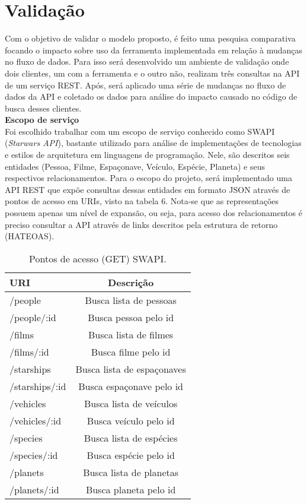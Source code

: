 \section{Validação}

Com o objetivo de validar o modelo proposto, é feito uma pesquisa comparativa focando o impacto sobre uso da ferramenta implementada em relação à mudanças no fluxo de dados. Para isso será desenvolvido um ambiente de validação onde dois clientes, um com a ferramenta e o outro não, realizam três consultas na API de um serviço REST. Após, será aplicado uma série de mudanças no fluxo de dados da API e coletado os dados para análise do impacto causado no código de busca desses clientes. \\

\textbf{Escopo de serviço} \\

Foi escolhido trabalhar com um escopo de serviço conhecido como SWAPI (\textit{Starwars API}), bastante utilizado para análise de implementações de tecnologias e estilos de arquitetura em linguagens de programação. Nele, são descritos seis entidades (Pessoa, Filme, Espaçonave, Veículo, Espécie, Planeta) e seus respectivos relacionamentos. Para o escopo do projeto, será implementado uma API REST que expõe consultas dessas entidades em formato JSON através de pontos de acesso em URIs, visto na tabela 6. Nota-se que as representações possuem apenas um nível de expansão, ou seja, para acesso dos relacionamentos é preciso consultar a API através de links descritos pela estrutura de retorno (HATEOAS).

\begin{table}[H]
  \centering
  \begin{tabular}{|l|c|}
    \hline
    URI & Descrição \\
    \hline
    /people & Busca lista de pessoas \\
    \hline
    /people/:id & Busca pessoa pelo id \\
    \hline
    /films & Busca lista de filmes \\
    \hline
    /films/:id & Busca filme pelo id \\
    \hline
    /starships & Busca lista de espaçonaves \\
    \hline
    /starships/:id & Busca espaçonave pelo id \\
    \hline
    /vehicles & Busca lista de veículos \\
    \hline
    /vehicles/:id & Busca veículo pelo id \\
    \hline
    /species & Busca lista de espécies \\
    \hline
    /species/:id & Busca espécie pelo id \\
    \hline
    /planets & Busca lista de planetas \\
    \hline
    /planets/:id & Busca planeta pelo id \\
    \hline
  \end{tabular}
  \caption{Pontos de acesso (GET) SWAPI.}
\end{table}

